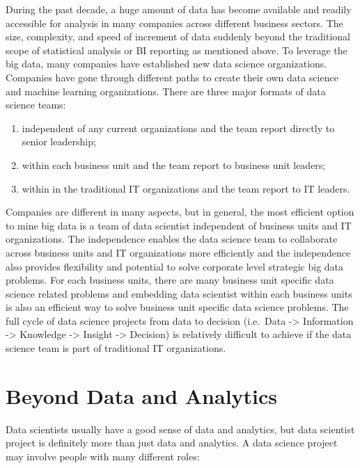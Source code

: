 \documentclass[]{book}
\providecommand{\tightlist}{%
  \setlength{\itemsep}{0pt}\setlength{\parskip}{0pt}}
\theoremstyle{definition}
\theoremstyle{definition}
\theoremstyle{remark}
\begin{document}
During the past decade, a huge amount of data has become available and
readily accessible for analysis in many companies across different
business sectors. The size, complexity, and speed of increment of data
suddenly beyond the traditional scope of statistical analysis or BI
reporting as mentioned above. To leverage the big data, many companies
have established new data science organizations. Companies have gone
through different paths to create their own data science and machine
learning organizations. There are three major formats of data science
teams:

\begin{enumerate}
\def\labelenumi{(\arabic{enumi})}
\tightlist
\item
  independent of any current organizations and the team report directly
  to senior leadership;\\
\item
  within each business unit and the team report to business unit
  leaders;\\
\item
  within in the traditional IT organizations and the team report to IT
  leaders.
\end{enumerate}

Companies are different in many aspects, but in general, the most
efficient option to mine big data is a team of data scientist
independent of business units and IT organizations. The independence
enables the data science team to collaborate across business units and
IT organizations more efficiently and the independence also provides
flexibility and potential to solve corporate level strategic big data
problems. For each business units, there are many business unit specific
data science related problems and embedding data scientist within each
business units is also an efficient way to solve business unit specific
data science problems. The full cycle of data science projects from data
to decision (i.e.~Data -\textgreater{} Information -\textgreater{}
Knowledge -\textgreater{} Insight -\textgreater{} Decision) is
relatively difficult to achieve if the data science team is part of
traditional IT organizations.

\section{Beyond Data and Analytics}\label{beyond-data-and-analytics}

Data scientists usually have a good sense of data and analytics, but
data scientist project is definitely more than just data and analytics.
A data science project may involve people with many different roles:
\end{document}
